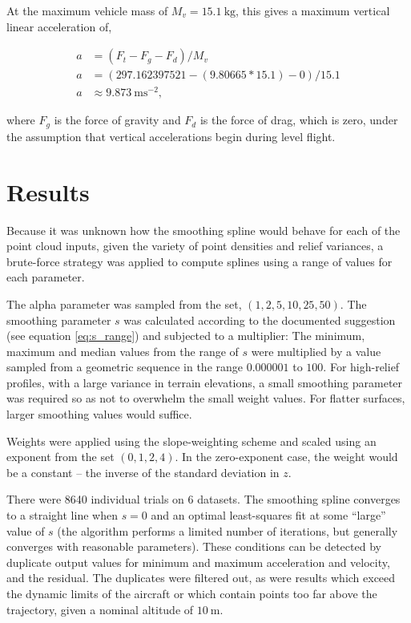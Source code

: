 \documentclass[doc]{apa6}
\begin{document}
At the maximum vehicle mass of $M_v = \SI{15.1}{\kg}$, this gives a maximum vertical linear acceleration of,

\begin{equation}
\begin{split}
a &= (F_t - F_g - F_d) / M_v \\
a &= (297.162397521 - (9.80665 * 15.1) - 0) / 15.1 \\
a &\approx \SI{9.873}{\m\s^{-2}}, %
\end{split}
\end{equation}

where $F_g$ is the force of gravity and $F_d$ is the force of drag, which is zero, under the assumption that vertical accelerations begin during level flight.



\section{Results}

Because it was unknown how the smoothing spline would behave for each of the point cloud inputs, given the variety of point densities and relief variances, a brute-force strategy was applied to compute splines using a range of values for each parameter.

The alpha parameter was sampled from the set, $(1, 2, 5, 10, 25, 50)$. The smoothing parameter $s$ was calculated according to the documented suggestion (see equation \ref{eq:s_range}) and subjected to a multiplier: The minimum, maximum and median values from the range of $s$ were multiplied by a value sampled from a geometric sequence in the range $0.000001$ to $100$. For high-relief profiles, with a large variance in terrain elevations, a small smoothing parameter was required so as not to overwhelm the small weight values. For flatter surfaces, larger smoothing values would suffice. 

Weights were applied using the slope-weighting scheme and scaled using an exponent from the set $(0, 1, 2, 4)$. In the zero-exponent case, the weight would be a constant -- the inverse of the standard deviation in $z$.

There were 8640 individual trials on 6 datasets. The smoothing spline converges to a straight line when $s=0$ and an optimal  least-squares fit at some ``large'' value of $s$ (the algorithm performs a limited number of iterations, but generally converges with reasonable parameters). These conditions can be detected by duplicate output values for minimum and maximum acceleration and velocity, and the residual. The duplicates were filtered out, as were results which exceed the dynamic limits of the aircraft or which contain points too far above the trajectory, given a nominal altitude of $\SI{10}\m$. 
\end{document}

